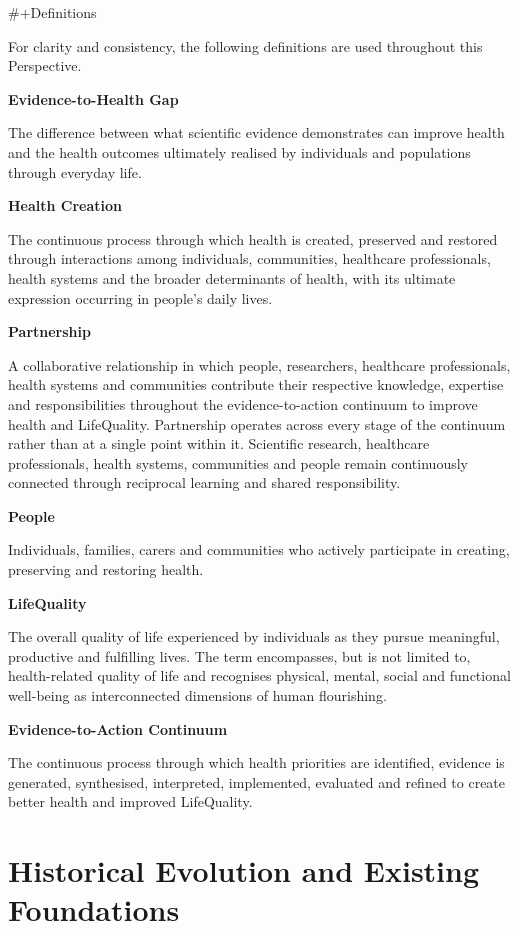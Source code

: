 \documentclass{article}
\begin{document}
\#+Definitions

For clarity and consistency, the following definitions are used throughout this Perspective.

\textbf{\textbf{Evidence-to-Health Gap}}

The difference between what scientific evidence demonstrates can improve health and the health outcomes ultimately realised by individuals and populations through everyday life.

\textbf{\textbf{Health Creation}}

The continuous process through which health is created, preserved and restored through interactions among individuals, communities, healthcare professionals, health systems and the broader determinants of health, with its ultimate expression occurring in people's daily lives.

\textbf{\textbf{Partnership}}

A collaborative relationship in which people, researchers, healthcare professionals, health systems and communities contribute their respective knowledge, expertise and responsibilities throughout the evidence-to-action continuum to improve health and LifeQuality. Partnership operates across every stage of the continuum rather than at a single point within it. Scientific research, healthcare professionals, health systems, communities and people remain continuously connected through reciprocal learning and shared responsibility.

\textbf{\textbf{People}}

Individuals, families, carers and communities who actively participate in creating, preserving and restoring health.

\textbf{\textbf{LifeQuality}}

The overall quality of life experienced by individuals as they pursue meaningful, productive and fulfilling lives. The term encompasses, but is not limited to, health-related quality of life and recognises physical, mental, social and functional well-being as interconnected dimensions of human flourishing.

\textbf{\textbf{Evidence-to-Action Continuum}}

The continuous process through which health priorities are identified, evidence is generated, synthesised, interpreted, implemented, evaluated and refined to create better health and improved LifeQuality.
\section{Historical Evolution and Existing Foundations}
\label{sec:org828fe4b}
\end{document}
